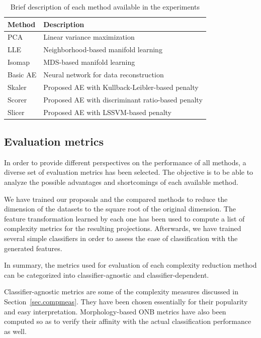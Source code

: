 \documentclass[
	fontsize=11pt, %
	twoside=false, %
	open=any, %
	secnumdepth=1, %
]{kaobook}
\begin{document}
\begin{table}[ht]
  \centering
  \caption{\label{tbl.methods}Brief description of each method available in the experiments}
  \begin{tabular}{ll}
    \toprule
    Method              & Description                                       \\
    \midrule
    PCA\cite{PCABook}   & Linear variance maximization                      \\
    LLE\cite{LLE}       & Neighborhood-based manifold learning              \\
    Isomap\cite{Isomap} & MDS-based manifold learning                       \\
    Basic AE\cite{AEs}  & Neural network for data reconstruction            \\
    Skaler              & Proposed AE with Kullback-Leibler-based penalty   \\
    Scorer              & Proposed AE with discriminant ratio-based penalty \\
    Slicer              & Proposed AE with LSSVM-based penalty              \\
    \bottomrule
  \end{tabular}
\end{table}

\subsection{Evaluation metrics}

In order to provide different perspectives on the performance of all methods, a diverse set of evaluation metrics has been selected. The objective is to be able to analyze the possible advantages and shortcomings of each available method.

We have trained our proposals and the compared methods to reduce the dimension of the datasets to the square root of the original dimension. The feature transformation learned by each one has been used to compute a list of complexity metrics for the resulting projections. Afterwards, we have trained several simple classifiers in order to assess the ease of classification with the generated features.

In summary, the metrics used for evaluation of each complexity reduction method can be categorized into classifier-agnostic and classifier-dependent.

Classifier-agnostic metrics are some of the complexity measures discussed in Section~\ref{sec.compmeas}. They have been chosen essentially for their popularity and easy interpretation. Morphology-based ONB metrics have also been computed so as to verify their affinity with the actual classification performance as well. %
\end{document}
